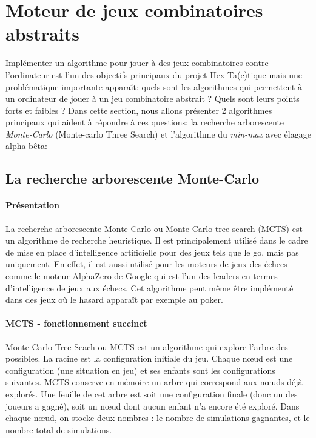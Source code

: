 \section{Moteur de jeux combinatoires abstraits}





Implémenter un algorithme pour jouer à des jeux combinatoires contre l'ordinateur est l'un des objectifs principaux du projet
Hex-Ta(c)tique mais une problématique importante apparaît: quels sont les algorithmes qui permettent à un ordinateur
de jouer à un jeu combinatoire abstrait ? Quels sont leurs points forts et faibles ? Dans cette section, nous allons
présenter 2 algorithmes principaux qui aident à répondre à ces questions: la recherche arborescente \emph{Monte-Carlo} (Monte-carlo Three Search) 
et l'algorithme du \emph{min-max} avec élagage alpha-bêta:

\subsection{La recherche arborescente Monte-Carlo}

\paragraph{Présentation}
La recherche arborescente Monte-Carlo ou Monte-Carlo tree search (MCTS) est un algorithme de recherche heuristique.
Il est principalement utilisé dans le cadre de mise en place d'intelligence artificielle pour des jeux tels que le go, mais pas uniquement.
En effet, il est aussi utilisé pour les moteurs de jeux des échecs comme le moteur AlphaZero de Google qui est
l'un des leaders en termes d'intelligence de jeux aux échecs. Cet algorithme peut même être implémenté dans des jeux où le hasard 
apparaît  par exemple au poker.

\paragraph{MCTS - fonctionnement succinct}
Monte-Carlo Tree Seach ou MCTS est un algorithme qui explore l'arbre des possibles. La racine est la configuration initiale du jeu.
Chaque nœud est une configuration (une situation en jeu) et ses enfants sont les configurations suivantes. MCTS conserve en mémoire 
un arbre qui correspond aux nœuds déjà explorés. Une feuille de cet arbre est soit une configuration finale (donc un des joueurs a gagné),
soit un nœud dont aucun enfant n'a encore été exploré. Dans chaque nœud, on stocke deux nombres : le nombre de simulations gagnantes, 
et le nombre total de simulations. 

